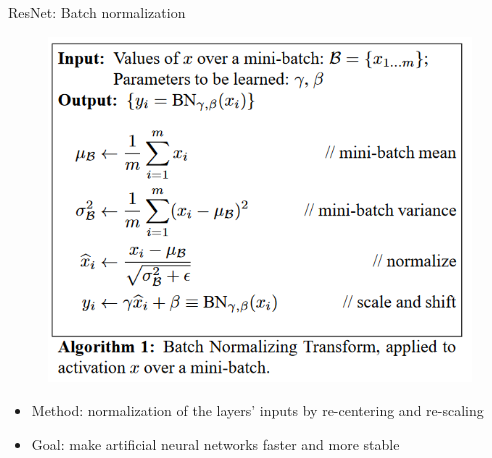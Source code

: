 \documentclass{beamer}
\begin{document}
\begin{frame}{ResNet: Batch normalization}
    
\begin{figure}
    \centering
    \includegraphics[scale=0.47]{images/BatchNormalization1.png}
\end{figure}    
    
\begin{itemize}
    \item Method: normalization of the layers' inputs by re-centering and re-scaling
    \item Goal: make artificial neural networks faster and more stable
\end{itemize}    
\end{frame}
\end{document}
